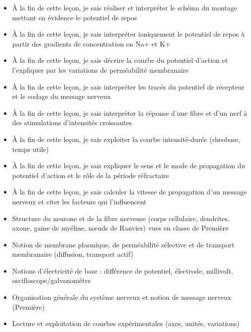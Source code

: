 \documentclass[11pt]{article}
\begin{document}
\begin{objectifs}
\begin{itemize}
\item À la fin de cette leçon, je sais réaliser et interpréter le schéma du montage mettant en évidence le potentiel de repos
\item À la fin de cette leçon, je sais interpréter ioniquement le potentiel de repos à partir des gradients de concentration en Na+ et K+
\item À la fin de cette leçon, je sais décrire la courbe du potentiel d'action et l'expliquer par les variations de perméabilité membranaire
\item À la fin de cette leçon, je sais interpréter les tracés du potentiel de récepteur et le codage du message nerveux
\item À la fin de cette leçon, je sais interpréter la réponse d'une fibre et d'un nerf à des stimulations d'intensités croissantes
\item À la fin de cette leçon, je sais exploiter la courbe intensité-durée (rheobase, temps utile)
\item À la fin de cette leçon, je sais expliquer le sens et le mode de propagation du potentiel d'action et le rôle de la période réfractaire
\item À la fin de cette leçon, je sais calculer la vitesse de propagation d'un message nerveux et citer les facteurs qui l'influencent
\end{itemize}
\end{objectifs}

\begin{prerequis}
\begin{itemize}
\item Structure du neurone et de la fibre nerveuse (corps cellulaire, dendrites, axone, gaine de myéline, nœuds de Ranvier) vues en classe de Première
\item Notion de membrane plasmique, de perméabilité sélective et de transport membranaire (diffusion, transport actif)
\item Notions d'électricité de base : différence de potentiel, électrode, millivolt, oscilloscope/galvanomètre
\item Organisation générale du système nerveux et notion de message nerveux (Première)
\item Lecture et exploitation de courbes expérimentales (axes, unités, variations)
\end{itemize}
\end{prerequis}
\end{document}
